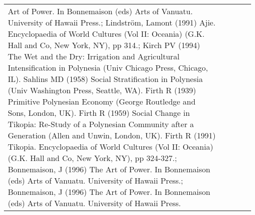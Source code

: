 \begin{longtable}{p{2cm}p{2cm}p{2cm}p{5cm}p{7cm}}
Art of Power. In Bonnemaison (eds) Arts of Vanuatu. University of Hawaii Press.; Lindström, Lamont (1991) Ajie. Encyclopaedia of World Cultures (Vol II: Oceania) (G.K. Hall and Co, New York, NY), pp 314.; Kirch PV (1994) The Wet and the Dry: Irrigation and Agricultural Intensification in Polynesia (Univ Chicago Press, Chicago, IL). Sahlins MD (1958) Social Stratification in Polynesia (Univ Washington Press, Seattle, WA). Firth R (1939) Primitive Polynesian Economy (George Routledge and Sons, London, UK). Firth R (1959) Social Change in Tikopia: Re-Study of a Polynesian Community after a Generation (Allen and Unwin, London, UK). Firth R (1991) Tikopia. Encyclopaedia of World Cultures (Vol II: Oceania) (G.K. Hall and Co, New York, NY), pp 324-327.; Bonnemaison, J (1996) The Art of Power. In Bonnemaison (eds) Arts of Vanuatu. University of Hawaii Press.; Bonnemaison, J (1996) The Art of Power. In Bonnemaison (eds) Arts of Vanuatu. University of Hawaii Press. \\ 

\end{longtable}
